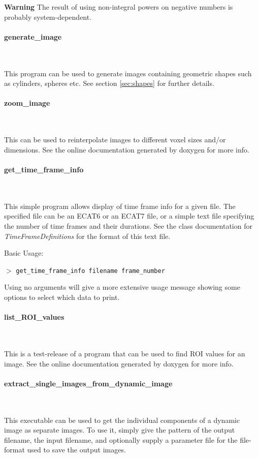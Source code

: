 \documentclass{article}
\newcommand{\subsubsubsection}[1]{\paragraph{#1}\mbox{} \\}
\newcommand{\cmdline}[1]{\par \noindent $>$ \texttt{#1}\par}
\begin{document}
\textbf{Warning} The result of using non-integral powers on negative 
numbers is probably system-dependent.

{ \subsubsubsection{generate\_image}
\label{sec:generate_image}}

This program can be used to generate 
images containing geometric shapes such as cylinders, spheres 
etc. See section \ref{sec:shapes} for further details.

{ \subsubsubsection{zoom\_image}
}

This can be used to reinterpolate 
images to different voxel sizes and/or dimensions. See the online 
documentation generated by doxygen for more info.

{ \subsubsubsection{get\_time\_frame\_info}
}
\label{sec:get_time_frame_info}
This simple program allows display of time frame info for a given 
file. The specified file can be an ECAT6 or an ECAT7 file, or 
a simple text file specifying the number of time frames and their 
durations. See the class documentation for \textit{TimeFrameDefinitions} 
for the format of this text file.


\noindent
Basic Usage:
\cmdline{get\_time\_frame\_info filename frame\_number}


Using no arguments will give a more extensive usage message showing 
some options to select which data to print.

{ \subsubsubsection{list\_ROI\_values}
}

This is a test-release of a program that can be used to find 
ROI values for an image. See the online documentation generated 
by doxygen for more info.

{ \subsubsubsection{extract\_single\_images\_from\_dynamic\_image}
}

This executable can be used to get the individual components of a 
dynamic image as separate images. 
To use it, simply give the pattern of the output filename, the input filename, and optionally
supply a parameter file for the file-format used to save the output images.
\end{document}
